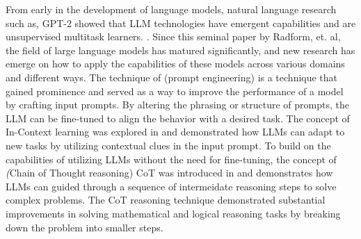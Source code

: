 From early in the development of language models, natural language research such as, GPT-2 showed that LLM technologies have emergent capabilities and are unsupervised multitask learners. \cite{radford2019language}. Since this seminal paper by Radform, et. al, the field of large language models has matured significantly, and new research has emerge on how to apply the capabilities of these models across various domains and different ways. The technique of \texit(prompt engineering) is a technique that gained prominence and served as a way to improve the performance of a model by crafting input prompts. By altering the phrasing or structure of prompts, the LLM can be fine-tuned to align the behavior with a desired task. \cite{liu2023pre} The concept of In-Context learning was explored in \cite{brown2020language} and demonstrated how LLMs can adapt to new tasks by utilizing contextual clues in the input prompt. To build on the capabilities of utilizing LLMs without the need for fine-tuning, the concept of \textit(Chain of Thought reasoning) CoT was introduced in \cite{huang2023language} and demonstrates how LLMs can guided through a sequence of intermeidate reasoning steps to solve complex problems. The CoT reasoning technique demonstrated substantial improvements in solving mathematical and logical reasoning tasks by breaking down the problem into smaller steps. 